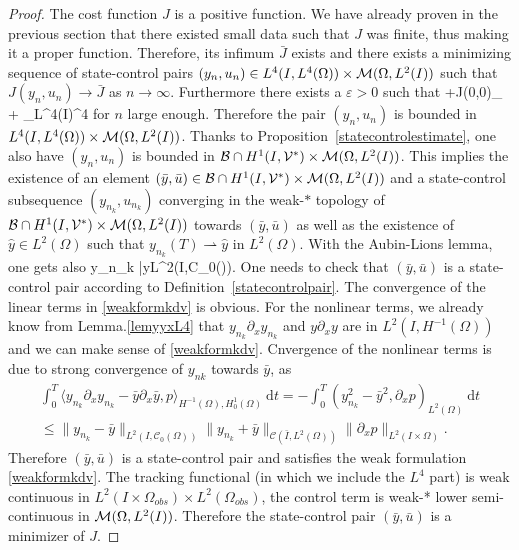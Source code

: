 \begin{proof}
 The cost function $J$ is a positive function. We have already proven in the previous section that there existed small data such that $J$ was finite, thus making it a proper function. Therefore, its infimum $\bar J$ exists and there exists a minimizing sequence of state-control pairs $(y_n,u_n) \in L^4(I,L^4(\Omega))\times \mathcal{M}(\Omega, L^{2}(I))$ such that $J(y_n, u_n) \rightarrow \bar J$ as $n \rightarrow \infty$. Furthermore there exists a $\varepsilon>0$ such that
\be
\varepsilon+J(0,0)\geq \alpha {}_{\M} +  _{L^4(I\times \Omega)}^4
\ee
for $n$ large enough. Therefore the pair $(y_n,u_n)$ is bounded in $L^4(I,L^4(\Omega))\times \mathcal{M}(\Omega, L^{2}(I))$. Thanks to Proposition~\ref{statecontrolestimate}, one also have $(y_n,u_n)$ is bounded in $\mathcal{B}\cap H^{1}(I, \mathcal{V}^{*})\times \mathcal{M}(\Omega, L^{2}(I))$. This implies the existence of an element $(\bar y, \bar u)\in \mathcal{B}\cap H^{1}(I, \mathcal{V}^{*})\times \mathcal{M}(\Omega, L^{2}(I))$ and a state-control subsequence $(y_{n_k},u_{n_k})$ converging in the weak-$*$ topology of $\mathcal{B}\cap H^{1}(I, \mathcal{V}^{*})\times\mathcal{M}(\Omega, L^{2}(I))$ towards $(\bar y, \bar u)$ as well as the existence of $\hat y \in L^2(\Omega)$ such that $y_{n_k}(T) \rightharpoonup \hat y$ in $L^2(\Omega)$. With the Aubin-Lions lemma, one gets also
\be
\nonumber
y_{n_k} \rightarrow \bar y\quad{}\quad L^2(I,\mathcal C_0(\Omega)).
\ee
One needs to check that $(\bar y, \bar u)$ is a state-control pair according to Definition~\ref{statecontrolpair}. The convergence of the linear terms in \eqref{weakformkdv} is obvious. For the nonlinear terms, we already know from Lemma.\ref{lemyyxL4} that $y_{n_{k}}\partial_{x} y_{n_{k}}$ and $y \partial_{x}y$ are in $L^{2}(I, H^{-1}(\Omega))$ and we can make sense of \eqref{weakformkdv}. Cnvergence of the nonlinear terms is due to strong convergence of $y_{nk}$ towards $\bar y$, as
\begin{multline*}
\int_0^T\langle y_{n_k}\partial_xy_{n_k}-\bar y\partial_x\bar y,p\rangle_{H^{-1}(\Omega),H^1_0(\Omega)}~\mathrm dt=-\int_0^T(y_{n_k}^2-\bar y^2,\partial_x p)_{L^2(\Omega)}~\mathrm dt\\
\leq\|y_{n_k}-\bar y\|_{L^2(I,\mathcal C_0(\Omega))}\|y_{n_k}+\bar y\|_{\mathcal C(\bar I,L^2(\Omega))}\|\partial_x p\|_{L^2(I\times \Omega)}.
\end{multline*}
Therefore $(\bar y, \bar u)$ is a state-control pair and satisfies the weak formulation \eqref{weakformkdv}. The tracking functional (in which we include the $L^4$ part) is weak continuous in $L^2(I\times \Omega_{obs})\times L^2(\Omega_{obs})$, the control term is weak-* lower semi-continuous in $\mathcal{M}(\Omega, L^{2}(I))$. Therefore the state-control pair $(\bar y, \bar u)$ is a minimizer of $J$.
\end{proof}


